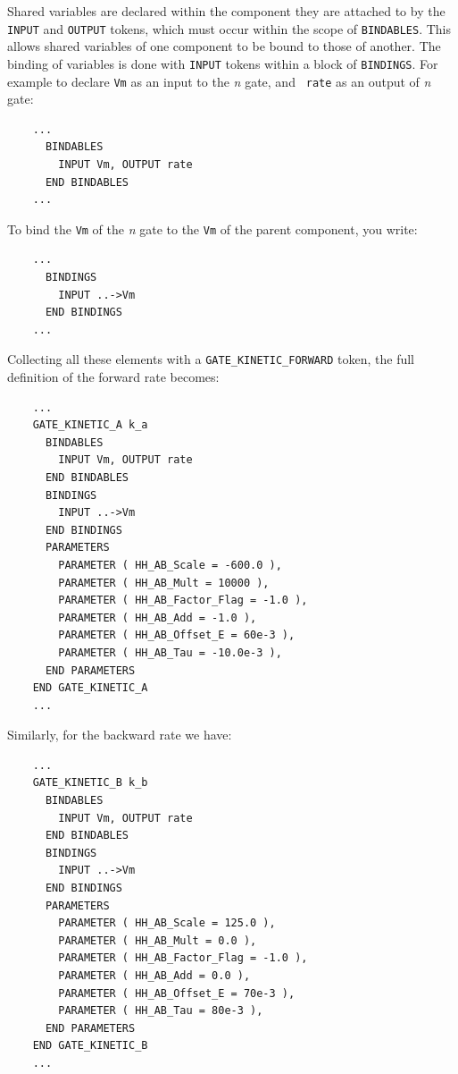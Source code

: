 \documentclass[12pt]{article}
\begin{document}
Shared variables are declared within the component they are attached
to by the {\tt INPUT} and {\tt OUTPUT} tokens, which must occur within
the scope of {\tt BINDABLES}.  This allows shared variables of one
component to be bound to those of another. The binding of variables is
done with {\tt INPUT} tokens within a block of {\tt BINDINGS}.  For
example to declare {\tt Vm} as an input to the {\it n} gate, and {\tt
  rate} as an output of {\it n} gate:

\begin{verbatim}
    ...
      BINDABLES
        INPUT Vm, OUTPUT rate
      END BINDABLES
    ...
\end{verbatim}

To bind the {\tt Vm} of the {\it n} gate to the {\tt Vm} of the parent
component, you write:

\begin{verbatim}
    ...
      BINDINGS
        INPUT ..->Vm
      END BINDINGS
    ...
\end{verbatim}

Collecting all these elements with a {\tt GATE\_KINETIC\_FORWARD}
token, the full definition of the forward rate becomes:

\begin{verbatim}
    ...
    GATE_KINETIC_A k_a
      BINDABLES
        INPUT Vm, OUTPUT rate
      END BINDABLES
      BINDINGS
        INPUT ..->Vm
      END BINDINGS
      PARAMETERS
        PARAMETER ( HH_AB_Scale = -600.0 ),
        PARAMETER ( HH_AB_Mult = 10000 ),
        PARAMETER ( HH_AB_Factor_Flag = -1.0 ),
        PARAMETER ( HH_AB_Add = -1.0 ),
        PARAMETER ( HH_AB_Offset_E = 60e-3 ),
        PARAMETER ( HH_AB_Tau = -10.0e-3 ),
      END PARAMETERS
    END GATE_KINETIC_A
    ...
\end{verbatim}

Similarly, for the backward rate we have:

\begin{verbatim}
    ...
    GATE_KINETIC_B k_b
      BINDABLES
        INPUT Vm, OUTPUT rate
      END BINDABLES
      BINDINGS
        INPUT ..->Vm
      END BINDINGS
      PARAMETERS
        PARAMETER ( HH_AB_Scale = 125.0 ),
        PARAMETER ( HH_AB_Mult = 0.0 ),
        PARAMETER ( HH_AB_Factor_Flag = -1.0 ),
        PARAMETER ( HH_AB_Add = 0.0 ),
        PARAMETER ( HH_AB_Offset_E = 70e-3 ),
        PARAMETER ( HH_AB_Tau = 80e-3 ),
      END PARAMETERS
    END GATE_KINETIC_B
    ...
\end{verbatim}
\end{document}
